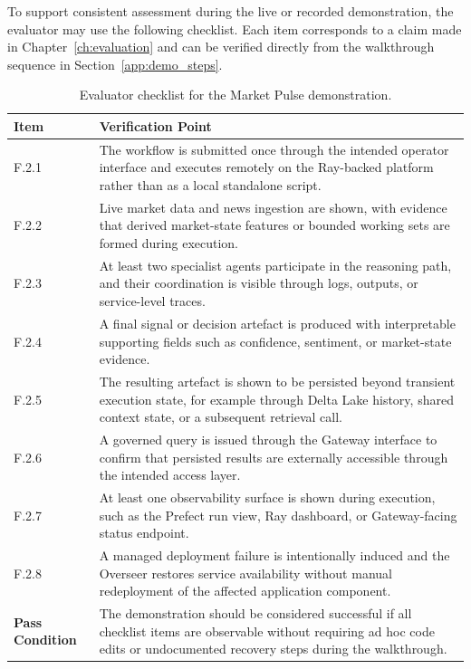 \documentclass[12pt, a4paper]{report}
\begin{document}
To support consistent assessment during the live or recorded demonstration, the
evaluator may use the following checklist. Each item corresponds to a claim made in
Chapter~\ref{ch:evaluation} and can be verified directly from the walkthrough
sequence in Section~\ref{app:demo_steps}.

\begin{table}[H]
  \centering
  \caption{Evaluator checklist for the Market Pulse demonstration.}
  \label{tab:demo_checklist}
  \begin{tabularx}{\textwidth}{p{}X}
    \toprule
    \textbf{Item} & \textbf{Verification Point} \\
    \midrule
    F.2.1 & The workflow is submitted once through the intended operator interface and executes remotely on the Ray-backed platform rather than as a local standalone script. \\
    \addlinespace
    F.2.2 & Live market data and news ingestion are shown, with evidence that derived market-state features or bounded working sets are formed during execution. \\
    \addlinespace
    F.2.3 & At least two specialist agents participate in the reasoning path, and their coordination is visible through logs, outputs, or service-level traces. \\
    \addlinespace
    F.2.4 & A final signal or decision artefact is produced with interpretable supporting fields such as confidence, sentiment, or market-state evidence. \\
    \addlinespace
    F.2.5 & The resulting artefact is shown to be persisted beyond transient execution state, for example through Delta Lake history, shared context state, or a subsequent retrieval call. \\
    \addlinespace
    F.2.6 & A governed query is issued through the Gateway interface to confirm that persisted results are externally accessible through the intended access layer. \\
    \addlinespace
    F.2.7 & At least one observability surface is shown during execution, such as the Prefect run view, Ray dashboard, or Gateway-facing status endpoint. \\
    \addlinespace
    F.2.8 & A managed deployment failure is intentionally induced and the Overseer restores service availability without manual redeployment of the affected application component. \\
    \midrule
    \textbf{Pass Condition} & The demonstration should be considered successful if all checklist items are observable without requiring ad hoc code edits or undocumented recovery steps during the walkthrough. \\
    \bottomrule
  \end{tabularx}
\end{table}
\end{document}
